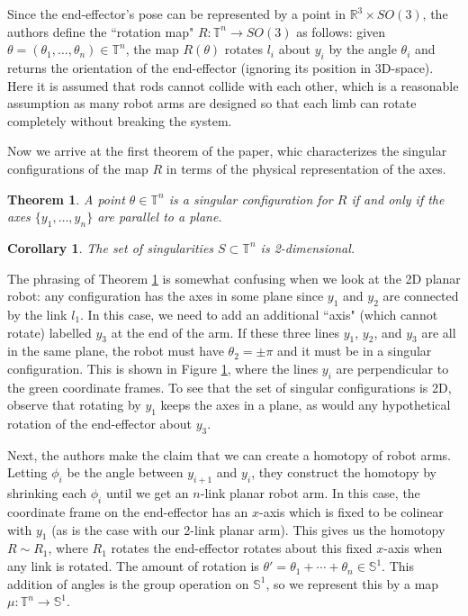 \documentclass[12pt]{article}
\newtheorem{thm}{Theorem}
\newtheorem*{cor}{Corollary}
\theoremstyle{definition}
\begin{document}
Since the end-effector's pose can be represented by a point in
\(\mathbb{R}^3\times SO(3)\), the authors define the ``rotation map" 
\(R : \mathbb{T}^n \rightarrow SO(3)\) as follows: 
given \(\theta = (\theta_1,\ldots,\theta_n) \in \mathbb{T}^n\),
the map \(R(\theta)\) rotates \(l_i\) about \(y_i\) by the angle \(\theta_i\)
and returns the orientation of the end-effector (ignoring its position in
3D-space). Here it is assumed that rods cannot collide with each other, which
is a reasonable assumption as many robot arms are designed so that each limb can
rotate completely without breaking the system.

Now we arrive at the first theorem of the paper, whic characterizes the singular
configurations of the map \(R\) in terms of the physical representation of the
axes.

\begin{thm}\label{thm:singular-plane}
    A point \(\theta \in \mathbb{T}^n\) is a singular configuration for \(R\) if
    and only if the axes \(\{y_1,\ldots,y_n\}\) are parallel to a plane.
\end{thm}
\begin{cor}
    The set of singularities \(S \subset \mathbb{T}^n\) is 2-dimensional.
\end{cor}

The phrasing of Theorem \ref{thm:singular-plane} is somewhat confusing when we
look at the 2D planar robot: any configuration has the axes in some plane since \(y_1\) and
\(y_2\) are connected by the link \(l_1\). 
In this case, we need to add an additional ``axis" (which cannot rotate) labelled
\(y_3\) at the end of the arm. If these three lines \(y_1\), \(y_2\), and \(y_3\)
are all in the same plane, the robot must have \(\theta_2 = \pm \pi\) and it
must be in a singular configuration. This is shown in Figure
\ref{fig:planar-singular-frames}, where the lines \(y_i\) are perpendicular to the
green coordinate frames.
To see that the set of singular configurations is 2D, observe that rotating by
\(y_1\) keeps the axes in a plane, as would any hypothetical rotation of the
end-effector about \(y_3\).

\begin{figure}

    \caption{}\label{fig:planar-singular-frames}
\end{figure}

Next, the authors make the claim that we can create a homotopy of robot arms.
Letting \(\phi_i\) be the angle between \(y_{i+1}\) and \(y_i\), they construct
the homotopy by shrinking each \(\phi_i\) until we get an \(n\)-link planar
robot arm. In this case, the coordinate frame on the end-effector has an 
\(x\)-axis which is fixed to be colinear with \(y_1\) (as is the case with our
2-link planar arm). This gives us the homotopy \(R \sim R_1\), where \(R_1\)
rotates the end-effector rotates about this fixed \(x\)-axis when any link
is rotated. The amount of rotation is 
\(\theta' = \theta_1 + \cdots + \theta_n \in \mathbb{S}^1\). This addition of
angles is the group operation on \(\mathbb{S}^1\), so we represent this by a map
\(\mu : \mathbb{T}^n \rightarrow \mathbb{S}^1\). 
\end{document}
